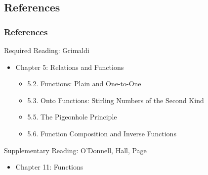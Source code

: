 \documentclass[dvipsnames]{beamer}
\begin{document}
\subsection*{References}

\begin{frame}
  \frametitle{References}

  \begin{block}{Required Reading: Grimaldi}
    \begin{itemize}
      \item Chapter 5: Relations and Functions
      \begin{itemize}
        \item 5.2. \alert{Functions: Plain and One-to-One}
        \item 5.3. \alert{Onto Functions: Stirling Numbers of the Second Kind}
        \item 5.5. \alert{The Pigeonhole Principle}
        \item 5.6. \alert{Function Composition and Inverse Functions}
      \end{itemize}
    \end{itemize}
  \end{block}

  \begin{block}{Supplementary Reading: O'Donnell, Hall, Page}
    \begin{itemize}
      \item Chapter 11: Functions
    \end{itemize}
  \end{block}
\end{frame}
\end{document}
